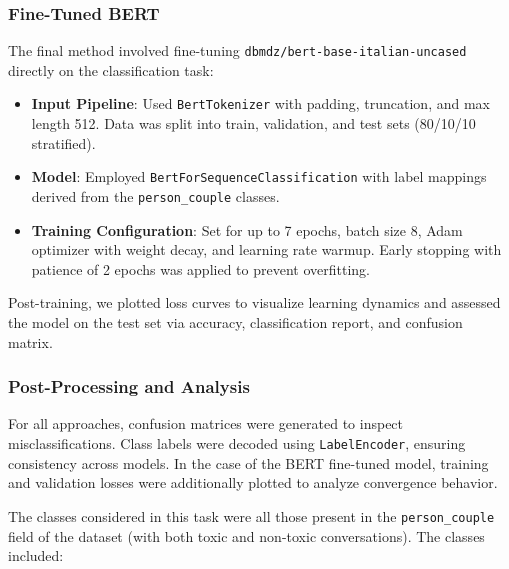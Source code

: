\documentclass[conference]{IEEEtran}
\begin{document}
\subsubsection{Fine-Tuned BERT}

The final method involved fine-tuning \texttt{dbmdz/bert-base-italian-uncased} directly on the classification task:
\begin{itemize}
    \item \textbf{Input Pipeline}: Used \texttt{BertTokenizer} with padding, truncation, and max length 512. Data was split into train, validation, and test sets (80/10/10 stratified).
    \item \textbf{Model}: Employed \texttt{BertForSequenceClassification} with label mappings derived from the \texttt{person\_couple} classes.
    \item \textbf{Training Configuration}: Set for up to 7 epochs, batch size 8, Adam optimizer with weight decay, and learning rate warmup. Early stopping with patience of 2 epochs was applied to prevent overfitting.
\end{itemize}
Post-training, we plotted loss curves to visualize learning dynamics and assessed the model on the test set via accuracy, classification report, and confusion matrix.

\subsubsection{Post-Processing and Analysis}

For all approaches, confusion matrices were generated to inspect misclassifications. Class labels were decoded using \texttt{LabelEncoder}, ensuring consistency across models. In the case of the BERT fine-tuned model, training and validation losses were additionally plotted to analyze convergence behavior. 

The classes considered in this task were all those present in the \texttt{person\_couple} field of the dataset (with both toxic and non-toxic conversations). The classes included:
\end{document}
